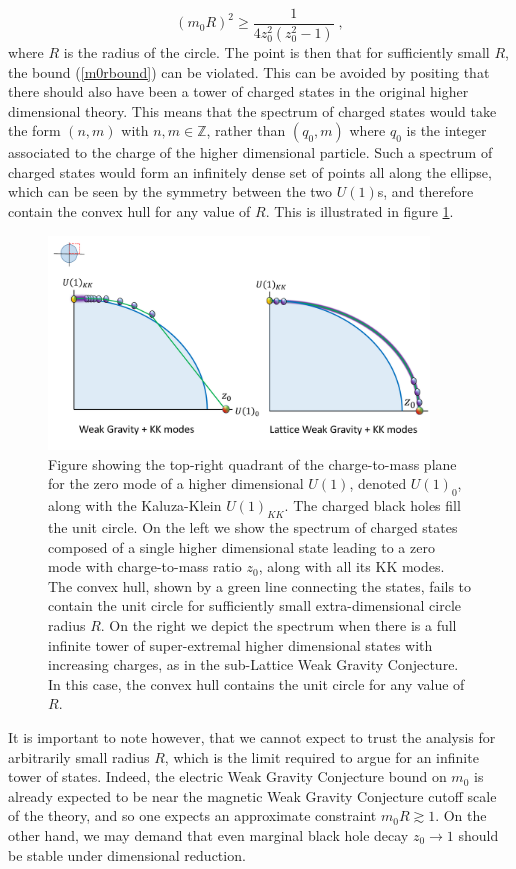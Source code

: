 \documentclass[11pt,a4paper]{article}
\numberwithin{equation}{section}
\numberwithin{table}{section}\setlength{\multlinegap}{25pt}
\newcommand{\be}{\begin{equation}}
\newcommand{\ee}{\end{equation}}
\begin{document}
\be
\label{m0rbound}
\left( m_0 R \right)^2 \geq \frac{1}{4z_0^2\left(z_0^2-1\right)} \;,
\ee
where $R$ is the radius of the circle. The point is then that for sufficiently small $R$, the bound (\ref{m0rbound}) can be violated. This can be avoided by positing that there should also have been a tower of charged states in the original higher dimensional theory. This means that the spectrum of charged states would take the form $\left(n,m\right)$ with $n,m \in \mathbb{Z}$, rather than $\left(q_0,m\right)$ where $q_0$ is the integer associated to the charge of the higher dimensional particle. Such a spectrum of charged states would form an infinitely dense set of points all along the ellipse, which can be seen by the symmetry between the two $U(1)$s, and therefore contain the convex hull for any value of $R$. This is illustrated in figure \ref{fig:ellwgcl}.
\begin{figure}[t]
\centering
 \includegraphics[width=0.9\textwidth]{FigCHlat.pdf}
\caption{Figure showing the top-right quadrant of the charge-to-mass plane for the zero mode of a higher dimensional $U(1)$, denoted $U(1)_0$, along with the Kaluza-Klein $U(1)_{KK}$. The charged black holes fill the unit circle. On the left we show the spectrum of charged states composed of a single higher dimensional state leading to a zero mode with charge-to-mass ratio $z_0$, along with all its KK modes. The convex hull, shown by a green line connecting the states, fails to contain the unit circle for sufficiently small extra-dimensional circle radius $R$. On the right we depict the spectrum when there is a full infinite tower of super-extremal higher dimensional states with increasing charges, as in the sub-Lattice Weak Gravity Conjecture. In this case, the convex hull contains the unit circle for any value of $R$.}
\label{fig:ellwgcl}
\end{figure}
It is important to note however, that we cannot expect to trust the analysis for arbitrarily small radius $R$, which is the limit required to argue for an infinite tower of states. Indeed, the electric Weak Gravity Conjecture bound on $m_0$ is already expected to be near the magnetic Weak Gravity Conjecture cutoff scale of the theory, and so one expects an approximate constraint $m_0 R \gtrsim 1$. On the other hand, we may demand that even marginal black hole decay $z_0 \rightarrow 1$ should be stable under dimensional reduction. 
\end{document}

